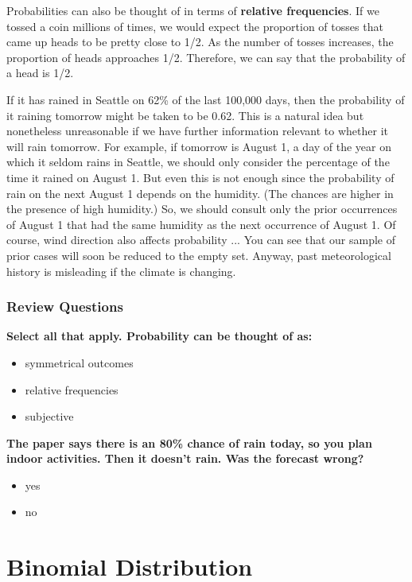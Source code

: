 \documentclass{book}
\begin{document}
Probabilities can also be thought of in terms of \textbf{relative
frequencies}. If we tossed a coin millions of times, we would expect the
proportion of tosses that came up heads to be pretty close to 1/2. As the
number of tosses increases, the proportion of heads approaches 1/2. Therefore,
we can say that the probability of a head is 1/2.

If it has rained in Seattle on 62\% of the last 100,000 days, then the
probability of it raining tomorrow might be taken to be 0.62. This is a
natural idea but nonetheless unreasonable if we have further information
relevant to whether it will rain tomorrow. For example, if tomorrow is August
1, a day of the year on which it seldom rains in Seattle, we should only
consider the percentage of the time it rained on August 1. But even this is
not enough since the probability of rain on the next August 1 depends on the
humidity. (The chances are higher in the presence of high humidity.) So, we
should consult only the prior occurrences of August 1 that had the same
humidity as the next occurrence of August 1. Of course, wind direction also
affects probability ... You can see that our sample of prior cases will soon
be reduced to the empty set. Anyway, past meteorological history is misleading
if the climate is changing.

\hypertarget{review-questions}{%
\subsection{Review Questions}\label{review-questions}}

\textbf{Select all that apply. Probability can be thought of as:}

\begin{itemize}
\item
  symmetrical outcomes
\item
  relative frequencies
\item
  subjective
\end{itemize}

\textbf{The paper says there is an 80\% chance of rain today, so you plan
indoor activities. Then it doesn't rain. Was the forecast wrong?}

\begin{itemize}
\item
  yes
\item
  no
\end{itemize}

\hypertarget{binomial-distribution}{%
\chapter{Binomial Distribution}\label{binomial-distribution}}
\end{document}

